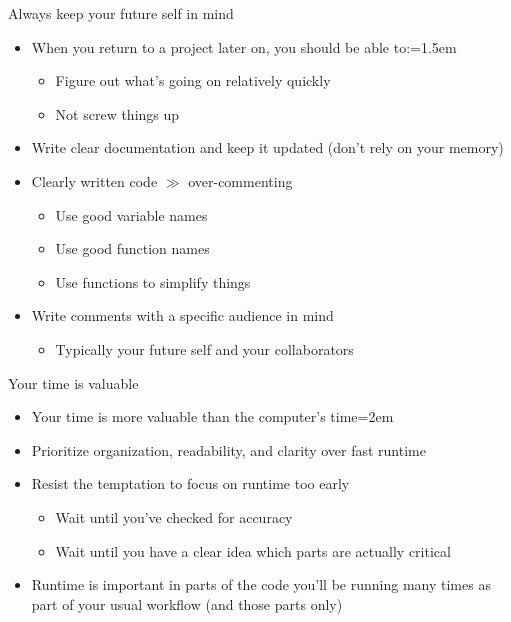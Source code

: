 \documentclass[handout]{beamer}
\begin{document}
\begin{frame}{Always keep your future self in mind}
    \begin{itemize}
        \item When you return to a project later on, you should be able to:\itemsep=1.5em
        \begin{itemize}
            \item Figure out what's going on relatively quickly
            \item Not screw things up
        \end{itemize}
        \item Write clear documentation and keep it updated (don't rely on your memory)
        \item Clearly written code $\gg$ over-commenting
        \begin{itemize}
            \item Use good variable names
            \item Use good function names
            \item Use functions to simplify things
        \end{itemize}
        \item Write comments with a specific audience in mind
        \begin{itemize}
            \item Typically your future self and your collaborators
        \end{itemize}
    \end{itemize}
\end{frame}

\begin{frame}{Your time is valuable}
    \begin{itemize}
        \item Your time is more valuable than the computer's time\itemsep=2em
        \item Prioritize organization, readability, and clarity over fast runtime
        \item Resist the temptation to focus on runtime too early
        \begin{itemize}
            \item Wait until you've checked for accuracy
            \item Wait until you have a clear idea which parts are actually critical
        \end{itemize}
        \item Runtime is important in parts of the code you'll be running many times as part of your usual workflow (and those parts only)
    \end{itemize}
\end{frame}
\end{document}

